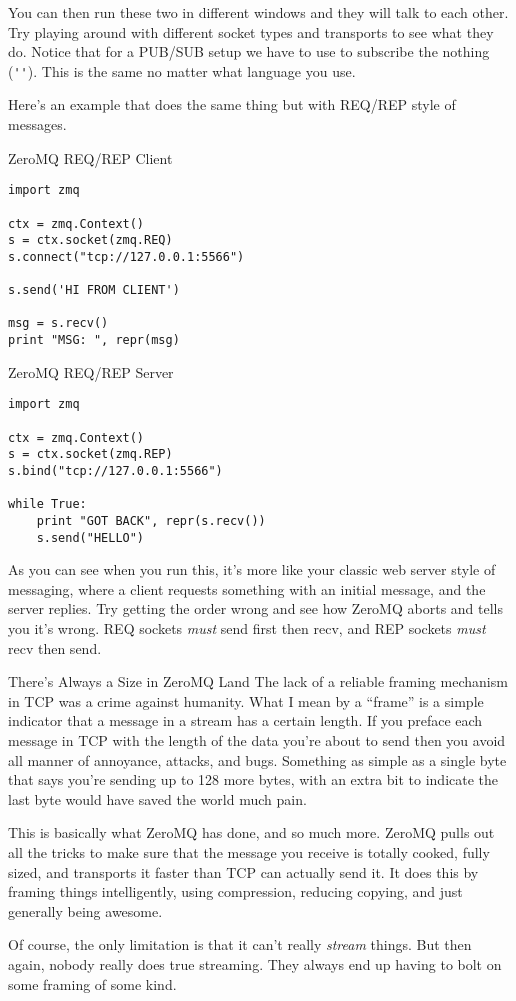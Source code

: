You can then run these two in different windows and they will talk to each
other.  Try playing around with different socket types and transports to see
what they do.  Notice that for a PUB/SUB setup we have to use 
to subscribe the nothing (\verb|''|).  This is the same no matter what language you
use.

Here's an example that does the same thing but with REQ/REP style of messages.

\begin{code}{ZeroMQ REQ/REP Client}
\begin{lstlisting}
import zmq

ctx = zmq.Context()
s = ctx.socket(zmq.REQ)
s.connect("tcp://127.0.0.1:5566")

s.send('HI FROM CLIENT')

msg = s.recv()
print "MSG: ", repr(msg)
\end{lstlisting}
\end{code}


\begin{code}{ZeroMQ REQ/REP Server}
\begin{lstlisting}
import zmq

ctx = zmq.Context()
s = ctx.socket(zmq.REP)
s.bind("tcp://127.0.0.1:5566")

while True:
    print "GOT BACK", repr(s.recv())
    s.send("HELLO")
\end{lstlisting}
\end{code}

As you can see when you run this, it's more like your classic web server style of messaging,
where a client requests something with an initial message, and the server replies.  Try getting
the order wrong and see how ZeroMQ aborts and tells you it's wrong.  REQ sockets \emph{must} send
first then recv, and REP sockets \emph{must} recv then send.

\begin{aside}{There's Always a Size in ZeroMQ Land}
The lack of a reliable framing mechanism in TCP was a crime against humanity.  What I mean by a
``frame'' is a simple indicator that a message in a stream has a certain length.  If you preface
each message in TCP with the length of the data you're about to send then you avoid all manner
of annoyance, attacks, and bugs.  Something as simple as a single byte that says you're sending up
to 128 more bytes, with an extra bit to indicate the last byte would have saved the world much
pain.

This is basically what ZeroMQ has done, and so much more.  ZeroMQ pulls out all the tricks to make
sure that the message you receive is totally cooked, fully sized, and transports it faster than
TCP can actually send it.  It does this by framing things intelligently, using compression, reducing
copying, and just generally being awesome.

Of course, the only limitation is that it can't really \emph{stream} things. But then again, nobody
really does true streaming.  They always end up having to bolt on some framing of some kind.
\end{aside}


